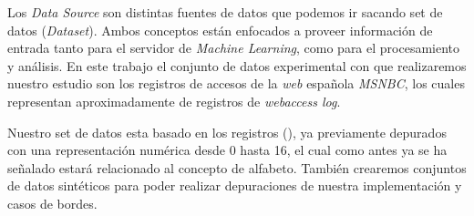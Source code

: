 
Los \emph{Data Source} son distintas fuentes de datos que podemos ir sacando set de datos (\emph{Dataset}). Ambos conceptos están enfocados a proveer información de entrada tanto para el servidor de \emph{Machine Learning}, como para el procesamiento y análisis.
En este trabajo el conjunto de datos experimental con que realizaremos nuestro estudio son los registros de accesos de la \emph{web} española \emph{MSNBC}\cite{Claude2014}, los cuales representan aproximadamente de registros de \emph{webaccess log}.

Nuestro set de  datos esta basado en los registros (\webasccesslog), ya previamente depurados con una representación numérica desde 0 hasta 16, el cual como antes ya se ha señalado estará relacionado al concepto de alfabeto. También crearemos conjuntos de datos sintéticos para poder realizar depuraciones de nuestra implementación y casos de bordes.
	
	 